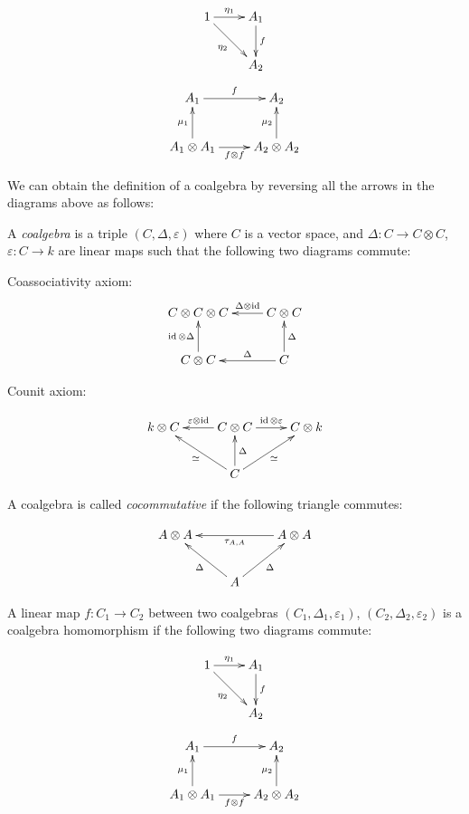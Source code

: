 \begin{equation}
    \xymatrix{
    1 \ar[r]^-{\eta_1} \ar[rd]_{\eta_2} & A_1 \ar[d]^-f \\
    & A_2
    }
\end{equation}
\begin{equation}
    \xymatrix{
    A_1 \ar[r]^-f & A_2 \\
    A_1 \otimes A_1 \ar[u]^-{\mu_1} \ar[r]_-{f\otimes f} & A_2 \otimes A_2 \ar[u]^-{\mu_2}
    }
\end{equation}


We can obtain the definition of a coalgebra by reversing all the arrows in the
diagrams above as follows:

\begin{defn}
    A \emph{coalgebra} is a triple $(C, \Delta, \varepsilon)$ where $C$ is a
    vector space, and $\Delta: C \to C \otimes C$, $\varepsilon: C \to k$ are
    linear maps such that the following two diagrams commute:

Coassociativity axiom:
\begin{equation}
\xymatrix{
C \otimes C \otimes C   & C \otimes C \ar[l]_-{\Delta \otimes \id}\\
 C \otimes C\ar[u]^-{\id \otimes \Delta}  & C \ar[l]_-\Delta \ar[u]_-{\Delta}
}
\end{equation}

Counit axiom:


\begin{equation}
    \xymatrix{
    k \otimes C  & C \otimes C \ar[l]_-{\varepsilon \otimes \id} \ar[r]^-{\id \otimes \varepsilon} & C \otimes k   \\
    & C \ar[u]_-\Delta \ar[lu]^-\simeq \ar[ru]_-{\simeq}&
    }
\end{equation}
\end{defn}
A coalgebra is called \emph{cocommutative} if the following triangle commutes:

\begin{equation}
    \xymatrix{
    A \otimes A   & & A \ar[ll]^-{\tau_{A,A}} \otimes A  \\
    & \ar[lu]^-\Delta A \ar[ru]_-\Delta&
    }
\end{equation}


A linear map $f: C_1 \to C_2$ between two coalgebras $(C_1, \Delta_1,
\varepsilon_1)$, $(C_2, \Delta_2, \varepsilon_2)$ is a coalgebra homomorphism
if the following two diagrams commute: 


\begin{equation}
    \xymatrix{
    1 \ar[r]^-{\eta_1} \ar[rd]_{\eta_2} & A_1 \ar[d]^-f \\
    & A_2
    }
\end{equation}
\begin{equation}
    \xymatrix{
    A_1 \ar[r]^-f & A_2 \\
    A_1 \otimes A_1 \ar[u]^-{\mu_1} \ar[r]_-{f\otimes f} & A_2 \otimes A_2 \ar[u]^-{\mu_2}
    }
\end{equation}



